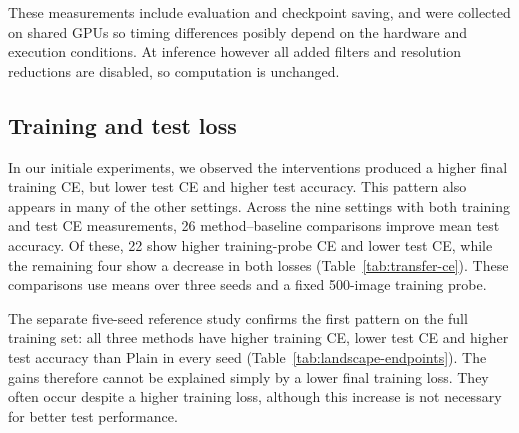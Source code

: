 These measurements include evaluation and checkpoint saving, and were collected on shared GPUs so timing differences posibly depend on the hardware and execution conditions. At inference however all added filters and resolution reductions are disabled, so computation is  unchanged. 
\FloatBarrier
\subsection{Training and test loss }
In our initiale experiments, we observed the interventions produced a higher final training CE, but lower test CE and higher test accuracy. This pattern also appears in many of the other settings. Across the nine settings with both training and test CE measurements, 26 method--baseline comparisons improve mean test accuracy. Of these, 22 show higher training-probe CE and lower test CE, while the remaining four show a decrease in both losses (Table~\ref{tab:transfer-ce}). These comparisons use means over three seeds and a fixed 500-image training probe.

The separate five-seed reference study confirms the first pattern on the full training set: all three methods have higher training CE, lower test CE and higher test accuracy than Plain in every seed (Table~\ref{tab:landscape-endpoints}). The gains therefore cannot be explained simply by a lower final training loss. They often occur despite a higher training loss, although this increase is not necessary for better test performance.





